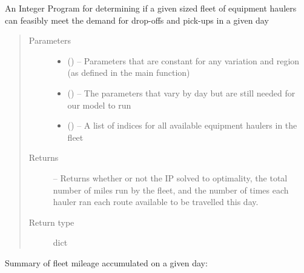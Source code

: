 \documentclass[letterpaper,10pt,english]{sphinxmanual}
\begin{document}
\begin{fulllineitems}
\label{\detokenize{daily-routing:hauler_routing.route_fleet}}
An Integer Program for determining if a given sized fleet of equipment
haulers can feasibly meet the demand for drop-offs and pick-ups in a
given day
\begin{quote}\begin{description}
\item[{Parameters}] \leavevmode\begin{itemize}
\item {} 
 () -- Parameters that are constant for any variation and region (as defined
in the main function)

\item {} 
 () -- The parameters that vary by day but are still needed for our model
to run

\item {} 
 () -- A list of indices for all available equipment haulers in the fleet

\end{itemize}

\item[{Returns}] \leavevmode
{} -- Returns whether or not the IP solved to optimality, the total number
of miles run by the fleet, and the number of times each hauler ran
each route available to be travelled this day.

\item[{Return type}] \leavevmode
dict

\end{description}\end{quote}

\end{fulllineitems}


Summary of fleet mileage accumulated on a given day:
\end{document}
